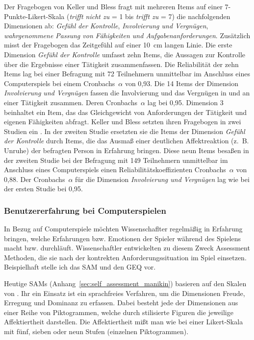 Der Fragebogen von Keller und Bless fragt mit mehreren Items auf einer 7-Punkte-Likert-Skala (\emph{trifft nicht zu} = 1 bis \emph{trifft zu} = 7) die nachfolgenden Dimensionen ab: \emph{Gefühl der Kontrolle}, \emph{Involvierung und Vergnügen}, \emph{wahrgenommene Passung von Fähigkeiten und Aufgabenanforderungen}. Zusätzlich misst der Fragebogen das Zeitgefühl auf einer 10~cm langen Linie. Die erste Dimension \emph{Gefühl der Kontrolle} umfasst zehn Items, die Aussagen zur Kontrolle über die Ergebnisse einer Tätigkeit zusammenfassen. Die Reliabilität der zehn Items lag bei einer Befragung mit 72 Teilnehmern unmittelbar im Anschluss eines Computerspiels bei einem Cronbachs~$\alpha$ von 0,93. Die 14 Items der Dimension \emph{Involvierung und Vergnügen} fassen die Involvierung und das Vergnügen in und an einer Tätigkeit zusammen. Deren Cronbachs~$\alpha$ lag bei 0,95. Dimension 3 beinhaltet ein Item, das das Gleichgewicht von Anforderungen der Tätigkeit und eigenen Fähigkeiten abfragt. Keller und Bless setzten ihren Fragebogen in zwei Studien ein \citep{Keller2008}. In der zweiten Studie ersetzten sie die Items der Dimension \emph{Gefühl der Kontrolle} durch Items, die das Ausmaß einer deutlichen Affektreaktion (z.~B. Unruhe) der befragten Person in Erfahrung bringen. Diese neun Items besaßen in der zweiten Studie bei der Befragung mit 149 Teilnehmern unmittelbar im Anschluss eines Computerspiels einen Reliabilitätskoeffizienten Cronbachs~$\alpha$ von 0,88. Der Cronbachs~$\alpha$ für die Dimension \emph{Involvierung und Vergnügen} lag wie bei der ersten Studie bei 0,95.


\subsubsection{Benutzererfahrung bei Computerspielen} %
\label{ssub:benutzererfahrung_bei_computerspielen}

In Bezug auf Computerspiele möchten Wissenschaflter regelmäßig in Erfahrung bringen, welche Erfahrungen bzw. Emotionen der Spieler während des Spielens macht bzw. durchläuft. Wissenschaftler entwickelten zu diesem Zweck Assessment Methoden, die sie nach der kontrekten Anforderungssituation im Spiel einsetzen. Beispielhaft stelle ich das \ac{SAM} und den \ac{GEQ} vor. 

Heutige \ac{SAM}s (Anhang~\ref{sec:self_assessment_manikin}) basieren auf den Skalen von \citet{Lang1980}. Ihr ein Einsatz ist ein sprachfreies Verfahren, um die Dimensionen Freude, Erregung und Dominanz zu erfassen. Dabei besteht jede der Dimensionen aus einer Reihe von Piktogrammen, welche durch stilisierte Figuren die jeweilige Affektiertheit darstellen. Die Affektiertheit mißt man wie bei einer Likert-Skala mit fünf, sieben oder neun Stufen (einzelnen Piktogrammen). 

